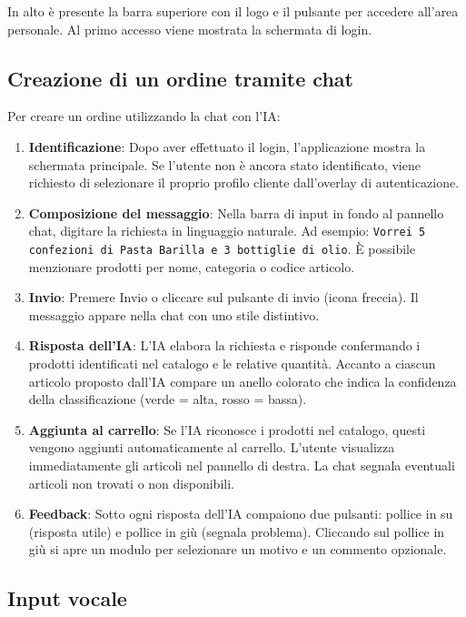 \documentclass[a4paper, 11pt, oneside]{scrartcl}
\begin{document}
In alto \`e presente la barra superiore con il logo e il pulsante per accedere all'area personale. Al primo accesso viene mostrata la schermata di login.

\subsection{Creazione di un ordine tramite chat}

Per creare un ordine utilizzando la chat con l'IA:

\begin{enumerate}
    \item \textbf{Identificazione}: Dopo aver effettuato il login, l'applicazione mostra la schermata principale. Se l'utente non \`e ancora stato identificato, viene richiesto di selezionare il proprio profilo cliente dall'overlay di autenticazione.
    \item \textbf{Composizione del messaggio}: Nella barra di input in fondo al pannello chat, digitare la richiesta in linguaggio naturale. Ad esempio: \texttt{Vorrei 5 confezioni di Pasta Barilla e 3 bottiglie di olio}. \`E possibile menzionare prodotti per nome, categoria o codice articolo.
    \item \textbf{Invio}: Premere Invio o cliccare sul pulsante di invio (icona freccia). Il messaggio appare nella chat con uno stile distintivo.
    \item \textbf{Risposta dell'IA}: L'IA elabora la richiesta e risponde confermando i prodotti identificati nel catalogo e le relative quantit\`a. Accanto a ciascun articolo proposto dall'IA compare un anello colorato che indica la confidenza della classificazione (verde = alta, rosso = bassa).
    \item \textbf{Aggiunta al carrello}: Se l'IA riconosce i prodotti nel catalogo, questi vengono aggiunti automaticamente al carrello. L'utente visualizza immediatamente gli articoli nel pannello di destra. La chat segnala eventuali articoli non trovati o non disponibili.
    \item \textbf{Feedback}: Sotto ogni risposta dell'IA compaiono due pulsanti: pollice in su (risposta utile) e pollice in gi\`u (segnala problema). Cliccando sul pollice in gi\`u si apre un modulo per selezionare un motivo e un commento opzionale.
\end{enumerate}

\subsection{Input vocale}
\end{document}
